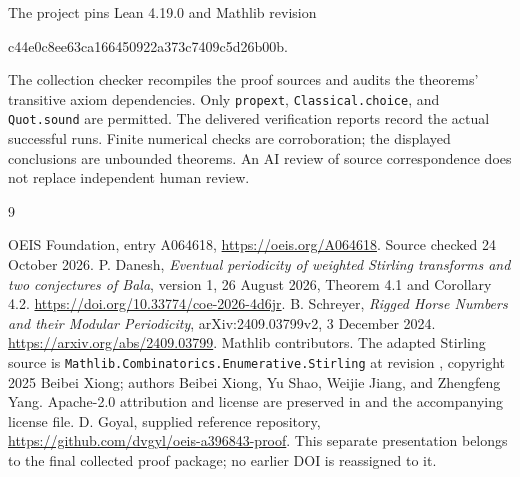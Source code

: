 \documentclass[11pt,a4paper]{article}
\theoremstyle{remark}
\begin{document}
The project pins Lean 4.19.0 and Mathlib revision
\begin{center}\small\ttfamily
c44e0c8ee63ca166450922a373c7409c5d26b00b.
\end{center}
The collection checker recompiles the proof sources and audits the
theorems' transitive axiom dependencies. Only \texttt{propext},
\texttt{Classical.choice}, and \texttt{Quot.sound} are permitted.
The delivered verification reports record the actual successful runs.
Finite numerical checks are corroboration; the displayed conclusions are
unbounded theorems. An AI review of source correspondence does not replace
independent human review.
\begin{thebibliography}{9}
\raggedright
{} OEIS Foundation, entry A064618,
\url{https://oeis.org/A064618}. Source checked 24 October 2026.
 P. Danesh, \emph{Eventual periodicity of weighted
Stirling transforms and two conjectures of Bala}, version 1,
26 August 2026, Theorem 4.1 and Corollary 4.2.
\url{https://doi.org/10.33774/coe-2026-4d6jr}.
 B. Schreyer, \emph{Rigged Horse Numbers and their
Modular Periodicity}, arXiv:2409.03799v2, 3 December 2024.
\url{https://arxiv.org/abs/2409.03799}.
 Mathlib contributors. The adapted Stirling source is
\texttt{Mathlib.Combinatorics.Enumerative.Stirling} at revision
, copyright 2025 Beibei Xiong;
authors Beibei Xiong, Yu Shao, Weijie Jiang, and Zhengfeng Yang.
Apache-2.0 attribution and license are preserved in
 and the accompanying license file.
 D. Goyal, supplied reference repository,
\url{https://github.com/dvgyl/oeis-a396843-proof}.
This separate presentation belongs to the final collected proof package;
no earlier DOI is reassigned to it.
\end{thebibliography}
\end{document}

